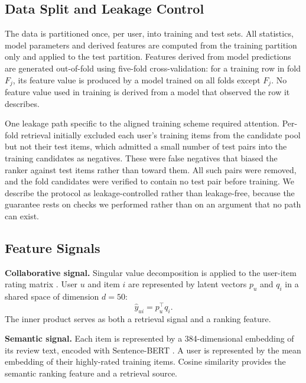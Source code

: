 \documentclass[10pt,twocolumn]{article}
\begin{document}
\subsection{Data Split and Leakage Control}
\label{sec:split}

The data is partitioned once, per user, into training and test sets. All
statistics, model parameters and derived features are computed from the
training partition only and applied to the test partition. Features derived
from model predictions are generated out-of-fold using five-fold
cross-validation: for a training row in fold $F_j$, its feature value is
produced by a model trained on all folds except $F_j$. No feature value used
in training is derived from a model that observed the row it describes.

One leakage path specific to the aligned training scheme required attention.
Per-fold retrieval initially excluded each user's training items from the
candidate pool but not their test items, which admitted a small number of test
pairs into the training candidates as negatives. These were false negatives
that biased the ranker against test items rather than toward them. All such
pairs were removed, and the fold candidates were verified to contain no test
pair before training. We describe the protocol as leakage-controlled rather
than leakage-free, because the guarantee rests on checks we performed rather
than on an argument that no path can exist.

\subsection{Feature Signals}
\label{sec:features}

\textbf{Collaborative signal.} Singular value decomposition is applied to the
user-item rating matrix \citep{koren2009matrix}. User $u$ and item $i$ are
represented by latent vectors $p_u$ and $q_i$ in a shared space of dimension
$d=50$:
\begin{equation}
\hat{y}_{ui} = p_u^{\top} q_i .
\end{equation}
The inner product serves as both a retrieval signal and a ranking feature.

\textbf{Semantic signal.} Each item is represented by a 384-dimensional
embedding of its review text, encoded with Sentence-BERT
\citep{reimers2019sentence}. A user is represented by the mean embedding of
their highly-rated training items. Cosine similarity provides the semantic
ranking feature and a retrieval source.
\end{document}

